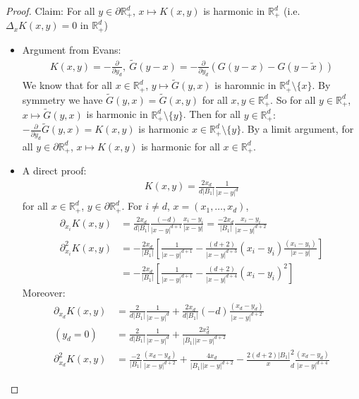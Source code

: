\documentclass{report}
\theoremstyle{tommy}
\begin{document}
  \begin{proof}
    Claim: For all \(y \in \partial \mathbb{R}_+^d\), \(x \mapsto K(x,y)\) is harmonic in \(\mathbb{R}_+^d\) (i.e. \(\Delta_x K(x,y) = 0\) in \(\mathbb{R}_+^d\))
    \begin{itemize}
      \item Argument from Evans: \begin{align*}
        K(x,y) = - \frac{\partial}{\partial y_d}, \ \tilde G(y-x) = - \frac{\partial}{\partial y_d}(G(y-x)-G(y-\tilde x))
      \end{align*}
      We know that for all \(x \in \mathbb{R}_+^d\), \(y \mapsto \tilde G(y,x)\) is haromnic in \(\mathbb{R}_+^d \setminus \{x\}\). By symmetry we have \(\tilde G(y,x) = \tilde G(x,y)\) for all \(x,y \in \mathbb{R}^d_+\). So for all \(y \in \mathbb{R}_+^d\), \(x \mapsto \tilde G(y,x)\) is harmonic in \(\mathbb{R}_+^d \setminus \{y\}\). Then for all \(y \in \mathbb{R}_+^d:\) \(- \frac{\partial}{\partial y_d} \tilde G(y,x)= K(x,y)\) is harmonic \(x \in \mathbb{R}_+^d \setminus \{y\}\). By a limit argument, for all \(y \in \partial \mathbb{R}_+^d\), \(x \mapsto K(x,y)\) is harmonic for all \(x \in \mathbb{R}_+^d\).
      \item  A direct proof:
      \begin{align*}
        K(x,y) = \frac{2 x_d}{d |B_1|} \frac{1}{|x-y|^d}
      \end{align*}
      for all \(x \in \mathbb{R}_+^d\), \(y \in \partial \mathbb{R}_+^d\). For \(i \ne d\), \(x=(x_1, \dots, x_d)\), 
      \begin{align*}
        \partial_{x_i} K(x,y) &= \frac{2 x_d}{d |B_1|} \frac{(-d)}{|x-y|^{d+1}}\frac{x_i-y_i}{|x-y|} = \frac{-2x_d}{|B_1|}\frac{x_i - y_i}{|x-y|^{d+2}} \\
        \partial_{x_i}^2 K(x,y) &= - \frac{2 x_d}{|B_1|} \left[\frac{1}{|x-y|^{d+1}} - \frac{(d+2)}{|x-y|^{d+3}}(x_i-y_i) \frac{(x_i-y_i)}{|x-y|}\right] \\
        &= - \frac{2 x_d}{|B_1|} \left[\frac{1}{|x-y|^{d+1}} - \frac{(d+2)}{|x-y|^{d+4}}(x_i-y_i)^2\right]
      \end{align*}
      Moreover:
      \begin{align*}
        \partial_{x_d} K(x,y) 
        &= \frac{2}{d|B_1|} \frac{1}{|x-y|^d} + \frac{2 x_d}{d|B_1|}(-d) \frac{(x_d-y_d)}{|x-y|^{d+2}} \\
        (y_d = 0) \quad &= \frac{2}{d|B_1|} \frac{1}{|x-y|^d} + \frac{2x_d^2}{|B_1||x-y|^{d+2}} \\
        \partial_{x_d}^2K(x,y) &= \frac{-2}{|B_1|} \frac{(x_d-y_d)}{|x-y|^{d+2}} + \frac{4 x_d}{|B_1||x-y|^{d+2}} - \frac{2(d+2){|B_1|}} x_d^2 \frac{(x_d - y_d)}{|x-y|^{d+4}}

\end{align*}
\end{itemize}
\end{proof}
\end{document}
